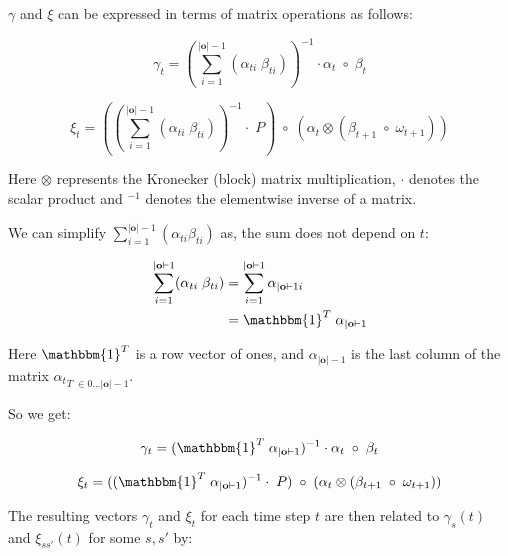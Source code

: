 $\gamma$ and $\xi$ can be expressed in terms of matrix operations as follows:

\begin{equation}
{\gamma}
    _t = (\sum_{i=1}^{|\mathbf{o}|-1} (\alpha_{t i} \;\beta_{t i}))^{-1} \cdot \alpha_t \; \circ \; \beta_t
    \label{eq:gamma-matrix}
\end{equation}

\begin{equation}
{\xi}
    _t = ((\sum_{i=1}^{|\mathbf{o}|-1} (\alpha_{t i} \; \beta_{t i}))^{-1} \cdot \; {P}) \; \circ \;(\alpha_t \otimes (\beta_{t+1} \; \circ \; {\omega}_{t+1}))
    \label{eq:xi-matrix}
\end{equation}

Here $\otimes$ represents the Kronecker (block) matrix multiplication, $\cdot$ denotes the scalar product and $^{-1}$ denotes the elementwise inverse of a matrix.

We can simplify $\sum_{i=1}^{|\mathbf{o}|-1} (\alpha_{t i} \beta_{t i})$ as, the sum does not depend on $t$:

\begin{align}
    \sum_{i=1}^{|\mathbf{o}|-1} (\alpha_{t i} \; \beta_{t i}) &= \sum_{i=1}^{|\mathbf{o}|-1} \alpha_{|\mathbf{o}|-1 i} \\
    &= \mathbbm{1}^T \; \alpha_{|\mathbf{o}|-1}
\end{align}

Here $\mathbbm{1}^T$ is a row vector of ones, and $\alpha_{|\mathbf{o}|-1}$ is the last column of the matrix ${\alpha_t}_{T \;\in 0\dots|\mathbf{o}|-1}$.

So we get:

\begin{equation}
{\gamma}
    _t = (\mathbbm{1}^T \; \alpha_{|\mathbf{o}|-1})^{-1} \cdot \alpha_t \; \circ \; \beta_t
    \label{eq:gamma-matrix-ones}
\end{equation}

\begin{equation}
{\xi}
    _t = ((\mathbbm{1}^T \; \alpha_{|\mathbf{o}|-1})^{-1} \cdot \; {P}) \; \circ \;(\alpha_t \otimes (\beta_{t+1} \; \circ \; {\omega}_{t+1}))
    \label{eq:xi-matrix-ones}
\end{equation}

The resulting vectors ${\gamma}_t$ and ${\xi}_t$ for each time step $t$ are then related to $\gamma_s(t)$ and $\xi_{ss'}(t)$ for some $s, s'$ by:

